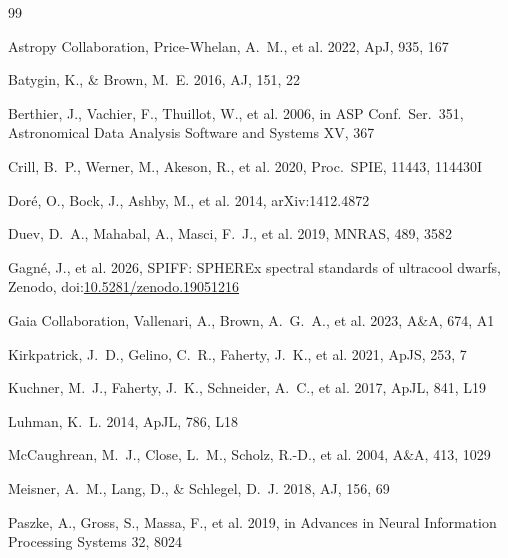 \documentclass[10pt,twocolumn]{article}
\begin{document}
\begin{thebibliography}{99}
\setlength{\itemsep}{1pt}
\small

Astropy Collaboration, Price-Whelan, A.~M., et al. 2022, ApJ, 935, 167

Batygin, K., \& Brown, M.~E. 2016, AJ, 151, 22

Berthier, J., Vachier, F., Thuillot, W., et al. 2006, in ASP Conf.\ Ser.\ 351, Astronomical Data Analysis
Software and Systems XV, 367

Crill, B.~P., Werner, M., Akeson, R., et al. 2020, Proc.\ SPIE, 11443, 114430I

Dor\'e, O., Bock, J., Ashby, M., et al. 2014, arXiv:1412.4872

Duev, D.~A., Mahabal, A., Masci, F.~J., et al. 2019, MNRAS, 489, 3582

Gagn\'e, J., et al. 2026, SPIFF: SPHEREx spectral standards of ultracool dwarfs, Zenodo,
doi:\href{https://doi.org/10.5281/zenodo.19051216}{10.5281/zenodo.19051216}

Gaia Collaboration, Vallenari, A., Brown, A.~G.~A., et al. 2023, A\&A, 674, A1

Kirkpatrick, J.~D., Gelino, C.~R., Faherty, J.~K., et al. 2021, ApJS, 253, 7

Kuchner, M.~J., Faherty, J.~K., Schneider, A.~C., et al. 2017, ApJL, 841, L19

Luhman, K.~L. 2014, ApJL, 786, L18

McCaughrean, M.~J., Close, L.~M., Scholz, R.-D., et al. 2004, A\&A, 413, 1029

Meisner, A.~M., Lang, D., \& Schlegel, D.~J. 2018, AJ, 156, 69

Paszke, A., Gross, S., Massa, F., et al. 2019, in Advances in Neural Information Processing Systems 32,
8024

\end{thebibliography}
\end{document}
